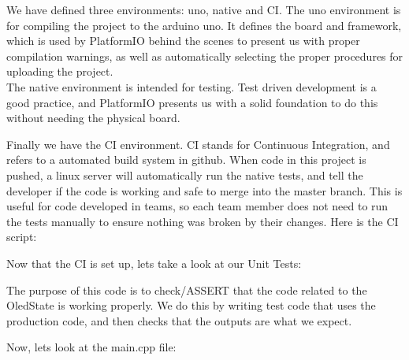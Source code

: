 \documentclass[journal]{IEEEtran}
\begin{document}
We have defined three environments: uno, native and CI. The uno environment
is for compiling the project to the arduino uno. It defines the board and
framework, which is used by PlatformIO behind the scenes to present us with
proper compilation warnings, as well as automatically selecting the
proper procedures for uploading the project.\\

The native environment is intended for testing. Test driven development is a good practice,
and PlatformIO presents us with a solid foundation to do this without needing the
physical board.

\onecolumn

Finally we have the CI environment. CI stands for Continuous Integration,
and refers to a automated build system in github. When code in this project is pushed,
a linux server will automatically run the native tests, and tell the developer if the code
is working and safe to merge into the master branch. This is useful for code developed
in teams, so each team member does not need to run the tests manually to ensure nothing was
broken by their changes. Here is the CI script:


Now that the CI is set up, lets take a look at our Unit Tests:

The purpose of this code is to check/ASSERT that the code related to the OledState is working properly.
We do this by writing test code that uses the production code, and then checks that
the outputs are what we expect.

Now, lets look at the main.cpp file:

\end{document}
